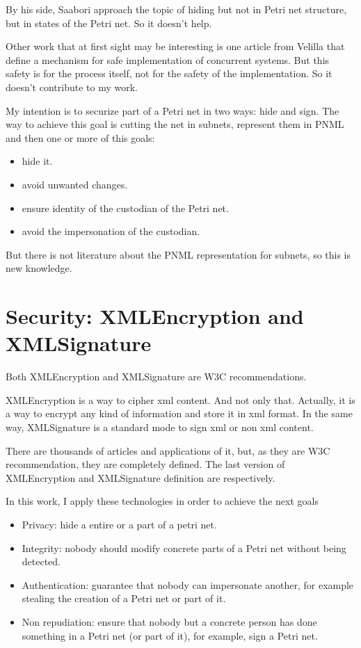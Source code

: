 By his side, Saabori \cite{HID-Saboori20106759} approach the topic of hiding
but not in Petri net structure, but in states of the Petri net. So it doesn't
help. 
 
Other work that at first sight may be interesting is one article from Velilla
\cite{SM-Velilla198875} that define a mechanism for safe implementation of
concurrent systems. But this safety is for the process itself, not for the
safety of the implementation. So it doesn't contribute to my work. 
 
My intention is to securize part of a Petri net in two ways: hide and sign. The way to achieve this goal
is cutting the net in subnets, represent them in PNML and then one or more
of this goals:
\begin{itemize}
\item hide it.
\item avoid unwanted changes.
\item ensure identity of the custodian of the Petri net.\item avoid the impersonation of the custodian.
\end{itemize}

But there is not literature about the PNML representation for subnets, so
this is new knowledge.





\section{Security: XMLEncryption and XMLSignature}

Both XMLEncryption and XMLSignature are W3C recommendations.

XMLEncryption is a way to cipher xml content. And not only that. Actually, it is a way to encrypt any kind
of information and store it in xml format. In the same way, XMLSignature is a standard mode to sign xml or non xml content.

 
There are thousands
of articles and applications of it, but, as they are W3C recommendation, they are completely defined. The last version of XMLEncryption and XMLSignature definition  are \cite{XMLENC-w3.org/xmlenc-core1,XMLSIG-w3.org/xmlsig-core1} respectively.

In this work, I apply these technologies in order to achieve the next goals
\begin{itemize}
\item Privacy: hide a entire or a part of a petri net.
\item Integrity: nobody should modify concrete parts of a Petri net without
being detected.
\item Authentication: guarantee that nobody can impersonate another, for
example stealing the creation of a Petri net or part of it.
\item Non repudiation: ensure that nobody but a concrete person has done
something in a Petri net (or part of it), for example, sign a Petri net.

\end{itemize}

